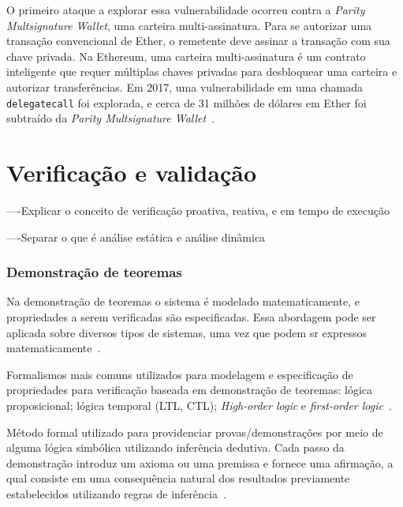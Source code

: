O primeiro ataque a explorar essa vulnerabilidade ocorreu contra a \textit{Parity Multsignature Wallet}, uma carteira multi-assinatura. Para se autorizar uma transação convencional de Ether, o remetente deve assinar a transação com sua chave privada. Na Ethereum, uma carteira multi-assinatura é um contrato inteligente que requer múltiplas chaves privadas para desbloquear uma carteira e autorizar transferências. Em 2017, uma vulnerabilidade em uma chamada \texttt{delegatecall} foi explorada, e cerca de 31 milhões de dólares em Ether foi subtraído da \textit{Parity Multsignature Wallet}~\cite{chen2020survey-ethereum-acm}.





\section{Verificação e validação}


----Explicar o conceito de verificação proativa, reativa, e em tempo de execução

----Separar o que é análise estática e análise dinâmica

\subsubsection*{\textbf{Demonstração de teoremas}}
Na demonstração de teoremas o sistema é modelado matematicamente, e propriedades a serem verificadas são especificadas. Essa abordagem pode ser aplicada sobre diversos tipos de sistemas, uma vez que podem sr expressos matematicamente~\cite{almakhour2020verification-survey}.

Formalismos mais comuns utilizados para modelagem e especificação de propriedades para verificação baseada em demonstração de teoremas: lógica proposicional; lógica temporal (LTL, CTL); \textit{High-order logic} e \textit{first-order logic}~\cite{harrison2008theorem}. 

Método formal utilizado para providenciar provas/demonstrações por meio de alguma lógica simbólica utilizando inferência dedutiva. Cada passo da demonstração introduz um axioma ou uma premissa e fornece uma afirmação, a qual consiste em uma consequência natural dos resultados previamente estabelecidos utilizando regras de inferência~\cite{singh2020survey-vulnerabilities-elsevier}.


